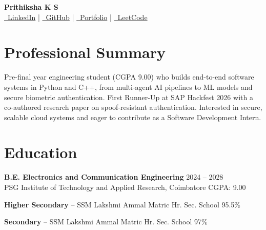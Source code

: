 \documentclass[a4paper,10pt]{article}
\begin{document}
\pagestyle{empty}

\begin{center}
{\LARGE \textbf{Prithiksha K S}} \\[3pt]
{\small
\href{https://www.linkedin.com/in/prithikshaks-3139}{\faLinkedin\ LinkedIn}
\quad | \quad
\href{https://github.com/prithi-workspace09}{\faGithub\ GitHub}
\quad | \quad
\href{https://prithi-workspace09.github.io/prithiksha.github.io/}{\faGlobe\ Portfolio}
\quad | \quad
\href{https://leetcode.com/u/prithikshaks/}{\faCode\ LeetCode}}
\end{center}

\vspace{-8pt}

\section{Professional Summary}
Pre-final year engineering student (CGPA 9.00) who builds end-to-end software systems in Python and C++,
from multi-agent AI pipelines to ML models and secure biometric authentication. First Runner-Up at
SAP Hackfest 2026 with a co-authored research paper on spoof-resistant authentication. Interested in
secure, scalable cloud systems and eager to contribute as a Software Development Intern.

\section{Education}
\textbf{B.E. Electronics and Communication Engineering} \hfill 2024 -- 2028 \\
PSG Institute of Technology and Applied Research, Coimbatore \hfill CGPA: 9.00

\textbf{Higher Secondary} -- SSM Lakshmi Ammal Matric Hr. Sec. School \hfill 95.5\%

\textbf{Secondary} -- SSM Lakshmi Ammal Matric Hr. Sec. School \hfill 97\%

\end{document}

